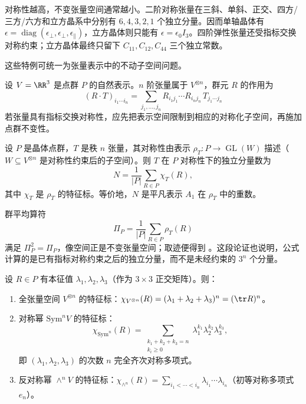 对称性越高，不变张量空间通常越小。二阶对称张量在三斜、单斜、正交、四方/三方/六方和立方晶系中分别有 $6,4,3,2,1$ 个独立分量。因而单轴晶体有 $\epsilon=\operatorname{diag}(\epsilon_\perp,\epsilon_\perp,\epsilon_\parallel)$，立方晶体则只能有 $\epsilon=\epsilon_0 I_3$。四阶弹性张量还受指标交换对称约束；立方晶体最终只留下 $C_{11},C_{12},C_{44}$ 三个独立常数。

这些特例可统一为张量表示中的不动子空间问题。

设 $V=\RR^3$ 是点群 $P$ 的自然表示。$n$ 阶张量属于 $V^{\otimes n}$，群元 $R$ 的作用为
\[
(R\cdot T)_{i_1\cdots i_n}=\sum_{j_1,\dots,j_n}R_{i_1j_1}\cdots R_{i_nj_n}\,T_{j_1\cdots j_n}
\]
若张量具有指标交换对称性，应先把表示空间限制到相应的对称化子空间，再施加点群不变性。

\begin{theorem}[张量独立分量的计数]
\label{thm:tensor-count-general}
设 $P$ 是晶体点群，$T$ 是秩 $n$ 张量，其对称性由表示 $\rho_T:P\to\operatorname{GL}(W)$ 描述（$W\subseteq V^{\otimes n}$ 是对称性约束后的子空间）。则 $T$ 在 $P$ 对称性下的独立分量数为
\begin{equation}
N=\frac1{|P|}\sum_{R\in P}\chi_T(R),
\label{eq:tensor-count-general}
\end{equation}
其中 $\chi_T$ 是 $\rho_T$ 的特征标。等价地，$N$ 是平凡表示 $A_1$ 在 $\rho_T$ 中的重数。
\end{theorem}

群平均算符
\[
\Pi_P=\frac1{|P|}\sum_{R\in P}\rho_T(R)
\]
满足 $\Pi_P^2=\Pi_P$，像空间正是不变张量空间；取迹便得到 。这段论证也说明，公式计算的是已有指标对称约束之后的独立分量，而不是未经约束的 $3^n$ 个分量。

\begin{proposition}[对称幂表示的特征标]
\label{prop:sym-power-char}
设 $R\in P$ 有本征值 $\lambda_1,\lambda_2,\lambda_3$（作为 $3\times3$ 正交矩阵）。则：
\begin{enumerate}[label=(\roman*),leftmargin=3em]
\item 全张量空间 $V^{\otimes n}$ 的特征标：$\chi_{V^{\otimes n}}(R)=(\lambda_1+\lambda_2+\lambda_3)^n=(\tr R)^n$。
\item 对称幂 $\mathrm{Sym}^n V$ 的特征标：
\begin{equation}
\chi_{\mathrm{Sym}^n}(R)=\sum_{\substack{k_1+k_2+k_3=n\\k_i\ge0}}\lambda_1^{k_1}\lambda_2^{k_2}\lambda_3^{k_3},
\label{eq:sym-power-char}
\end{equation}
即 $(\lambda_1,\lambda_2,\lambda_3)$ 的次数 $n$ 完全齐次对称多项式。
\item 反对称幂 $\wedge^n V$ 的特征标：$\chi_{\wedge^n}(R)=\sum_{i_1<\cdots<i_n}\lambda_{i_1}\cdots\lambda_{i_n}$（初等对称多项式 $e_n$）。
\end{enumerate}
\end{proposition}

